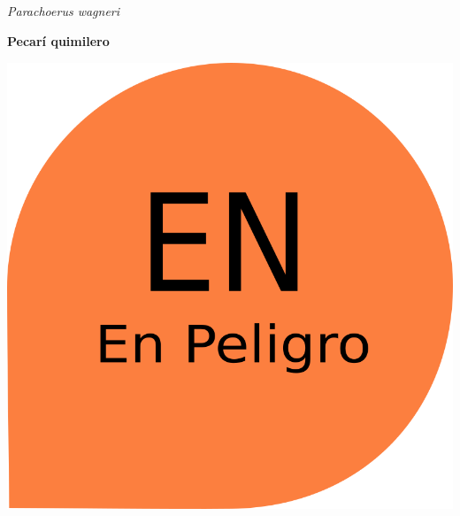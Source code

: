 \documentclass[
  x11names]{article}
\title{~}
\author{}
\date{\vspace{-2.5em}}
\begin{document}
\maketitle

\renewenvironment{framed}[1][\hsize]
  {\MakeFramed{\hsize#1\advance\hsize-\width \FrameRestore}}%
  {\endMakeFramed}

\setmainfont{Arial}
\setsansfont{Arial}
\setmonofont{Arial}

\newcommand\invisiblesection[1]{%
  \refstepcounter{section}%
  \addcontentsline{toc}{section}{\protect\numberline{\thesection}#1}%
  \sectionmark{#1}}


%

\vspace{-3cm}

\begin{minipage}{0.75\textwidth}
\vspace{0.15cm}
{\fontsize{18}{22}\selectfont\textit{Parachoerus wagneri}}

\vspace{0.3cm}
{\fontsize{30}{36}\selectfont\textbf{Pecarí quimilero}}
\end{minipage}
\hspace{0.05\textwidth}
\begin{minipage}{0.2\textwidth}
\includegraphics[width=\textwidth]{images/en.png}\\
\end{minipage}
\end{document}
